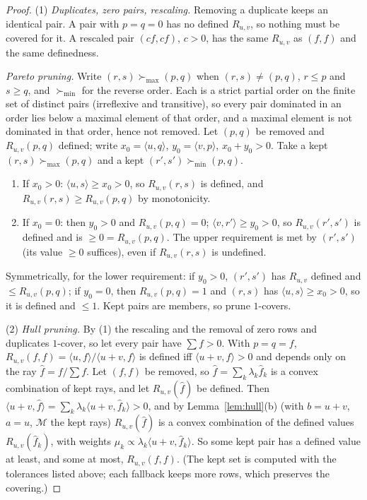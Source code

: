 \documentclass{article} %
\newcommand{\prune}{\mathrm{prune}}
\begin{document}
\begin{proof}
(1) \emph{Duplicates, zero pairs, rescaling.} Removing a duplicate keeps an identical pair.
A pair with $p=q=0$ has no defined $R_{u,v}$, so nothing must be covered for it. A
rescaled pair $(cf,cf)$, $c>0$, has the same $R_{u,v}$ as $(f,f)$ and the same definedness.

\emph{Pareto pruning.} Write $(r,s)\succ_{\max}(p,q)$ when $(r,s)\neq(p,q)$, $r\le p$ and
$s\ge q$, and $\succ_{\min}$ for the reverse order. Each is a strict partial order on the
finite set of distinct pairs (irreflexive and transitive), so every pair dominated in an
order lies below a maximal element of that order, and a maximal element is not dominated in
that order, hence not removed. Let $(p,q)$ be removed and $R_{u,v}(p,q)$ defined; write
$x_0=\langle u,q\rangle$, $y_0=\langle v,p\rangle$, $x_0+y_0>0$. Take a kept
$(r,s)\succ_{\max}(p,q)$ and a kept $(r',s')\succ_{\min}(p,q)$.
\begin{enumerate}
\item[(a)] If $x_0>0$: $\langle u,s\rangle\ge x_0>0$, so $R_{u,v}(r,s)$ is defined, and
  $R_{u,v}(r,s)\ge R_{u,v}(p,q)$ by monotonicity.
\item[(b)] If $x_0=0$: then $y_0>0$ and $R_{u,v}(p,q)=0$; $\langle v,r'\rangle\ge y_0>0$, so
  $R_{u,v}(r',s')$ is defined and is $\ge0=R_{u,v}(p,q)$. The upper requirement is met by
  $(r',s')$ (its value $\ge0$ suffices), even if $R_{u,v}(r,s)$ is undefined.
\end{enumerate}
Symmetrically, for the lower requirement: if $y_0>0$, $(r',s')$ has $R_{u,v}$ defined and
$\le R_{u,v}(p,q)$; if $y_0=0$, then $R_{u,v}(p,q)=1$ and $(r,s)$ has $\langle
u,s\rangle\ge x_0>0$, so it is defined and $\le1$. Kept pairs are members, so $\prune$
$1$-covers.

(2) \emph{Hull pruning.} By (1) the rescaling and the removal of zero rows and duplicates
$1$-cover, so let every pair have $\sum f>0$. With $p=q=f$,
$R_{u,v}(f,f)=\langle u,f\rangle/\langle u+v,f\rangle$ is defined iff
$\langle u+v,f\rangle>0$ and depends only on the ray $\hat f=f/\sum f$. Let $(f,f)$ be
removed, so $\hat f=\sum_k\lambda_k\hat f_k$ is a convex combination of kept rays, and let
$R_{u,v}(\hat f)$ be defined. Then $\langle u+v,\hat f\rangle=\sum_k\lambda_k\langle
u+v,\hat f_k\rangle>0$, and by Lemma~\ref{lem:hull}(b) (with $b=u+v$, $a=u$, $\mathcal M$
the kept rays) $R_{u,v}(\hat f)$ is a convex combination of the defined values
$R_{u,v}(\hat f_k)$, with weights $\mu_k\propto\lambda_k\langle u+v,\hat f_k\rangle$. So some
kept pair has a defined value at least, and some at most, $R_{u,v}(f,f)$. (The kept set is
computed with the tolerances listed above; each fallback keeps more rows, which preserves
the covering.)


\end{proof}
\end{document}
